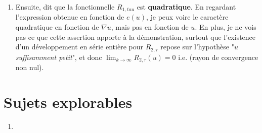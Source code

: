 \documentclass[
  french,
	11pt, %
]{fphw}
\begin{document}
\begin{enumerate}
  \item Ensuite, \citeauthor{balasoiu2020halthesis} dit que la fonctionnelle $R_{1,tau}$ est \textbf{quadratique}. En regardant l'expression obtenue en fonction de $e(u)$, je peux voire le caractère quadratique en fonction de $\nabla u$, mais pas en fonction de $u$. En plus, je ne vois pas ce que cette assertion apporte à la démonstration, surtout que l'existence d'un développement en série entière pour $R_{2,\tau}$ repose sur l'hypothèse "\textit{$u$ suffisamment petit}", et donc $\lim_{k \to \infty} R_{2,\tau}(u) = 0$ i.e. (rayon de convergence non nul).
\end{enumerate}


\section{Sujets explorables}

\begin{enumerate}
  \item 
\end{enumerate}

\clearpage   %
\printbibliography
\end{document}
